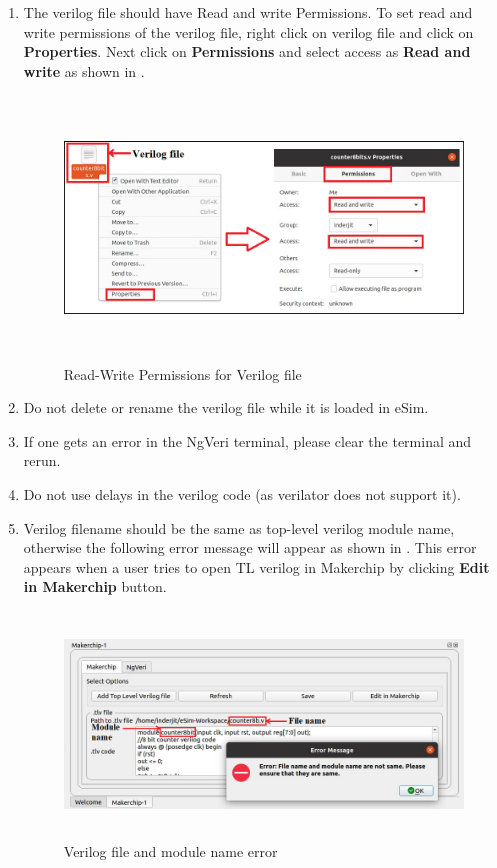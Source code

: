 \begin{enumerate}
\item The verilog file should have Read and write Permissions. To set read and write permissions of the verilog file, right click on verilog file and click on \textbf{Properties}. Next click on \textbf{Permissions} and select access as \textbf{Read and write} as shown in . 

\begin{figure}[H]
\centering
\includegraphics[width = 14cm, height =7cm]{./NgVeri/readwritepermission.png}
\caption{Read-Write Permissions for Verilog file}
\label{rdwr}
\end{figure}

\item Do not delete or rename the verilog file while it is loaded in eSim. 

\item If one gets an error in the NgVeri terminal, please clear the terminal and rerun. 

\item Do not use delays in the verilog code (as verilator does not support it). 

\item Verilog filename should be the same as top-level verilog module name, otherwise the following error message will appear as shown in . This error appears when a user tries to open TL verilog in Makerchip by clicking \textbf{Edit in Makerchip} button.

\begin{figure}[H]
\centering
\includegraphics[width = 14cm, height =6cm]{./NgVeri/modulenameerror.png}
\caption{Verilog file and module name error}
\label{error1}
\end{figure}


\end{enumerate}

